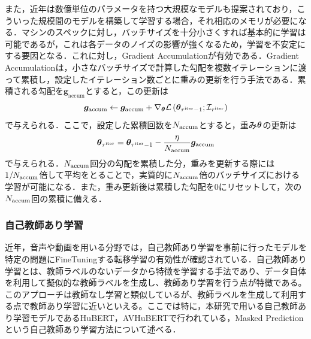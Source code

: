 また，近年は数億単位のパラメータを持つ大規模なモデルも提案されており，こういった規模間のモデルを構築して学習する場合，それ相応のメモリが必要になる．マシンのスペックに対し，バッチサイズを十分小さくすれば基本的に学習は可能であるが，これは各データのノイズの影響が強くなるため，学習を不安定にする要因となる．これに対し，Gradient Accumulationが有効である．Gradient Accumulationは，小さなバッチサイズで計算した勾配を複数イテレーションに渡って累積し，設定したイテレーション数ごとに重みの更新を行う手法である．累積される勾配を$\bm{g}_{\text{accum}}$とすると，この更新は
\begin{equation}
    \bm{g}_{\text{accum}} \gets \bm{g}_{\text{accum}} + \nabla_{\bm{\theta}} \mathcal{L}\left(\bm{\theta}_{\tau^{\text{iter}} - 1}; \mathcal{I}_{\tau^{\text{iter}}}\right)
\end{equation}
で与えられる．ここで，設定した累積回数を$N_{\text{accum}}$とすると，重み$\bm{\theta}$の更新は
\begin{equation}
    \bm{\theta}_{\tau^{\text{iter}}} = \bm{\theta}_{\tau^{\text{iter}} - 1} - \frac{\eta}{N_{\text{accum}}} \bm{g}_{\text{accum}}
\end{equation}
で与えられる．$N_{\text{accum}}$回分の勾配を累積した分，重みを更新する際には$1 / N_{\text{accum}}$倍して平均をとることで，実質的に$N_{\text{accum}}$倍のバッチサイズにおける学習が可能になる．また，重み更新後は累積した勾配を0にリセットして，次の$N_{\text{accum}}$回の累積に備える．

\subsubsection{自己教師あり学習}
\label{sec3:sec:ssl}
近年，音声や動画を用いる分野では，自己教師あり学習を事前に行ったモデルを特定の問題にFineTuningする転移学習の有効性が確認されている．自己教師あり学習とは、教師ラベルのないデータから特徴を学習する手法であり、データ自体を利用して擬似的な教師ラベルを生成し、教師あり学習を行う点が特徴である。このアプローチは教師なし学習と類似しているが、教師ラベルを生成して利用する点で教師あり学習に近いといえる。ここでは特に，本研究で用いる自己教師あり学習モデルであるHuBERT\cite{hsu2021hubert}，AVHuBERT\cite{shi2022learning}で行われている，Masked Predictionという自己教師あり学習方法について述べる．


